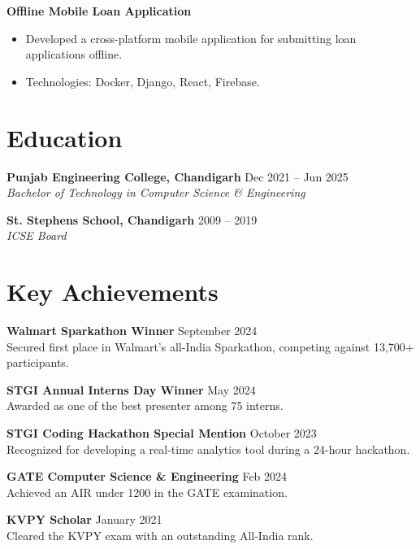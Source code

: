 \documentclass[a4paper,10pt]{article}
\begin{document}
\vspace{-1mm}
\textbf{Offline Mobile Loan Application} \hfill  \\
\vspace{-5mm}
\begin{itemize}[noitemsep]
    \item Developed a cross-platform mobile application for submitting loan applications offline.
    \item Technologies: Docker, Django, React, Firebase.
\end{itemize}

\vspace{-1mm}
\section*{Education}

\textbf{Punjab Engineering College, Chandigarh} \hfill Dec 2021 – Jun 2025 \\
\textit{Bachelor of Technology in Computer Science \& Engineering}

\vspace{-1mm}
\textbf{St. Stephens School, Chandigarh} \hfill 2009 – 2019 \\
\textit{ICSE Board}

\vspace{-1mm}
\section*{Key Achievements}

\textbf{Walmart Sparkathon Winner} \hfill September 2024 \\
Secured first place in Walmart’s all-India Sparkathon, competing against 13,700+ participants.

\vspace{-1mm}
\textbf{STGI Annual Interns Day Winner} \hfill May 2024 \\
Awarded as one of the best presenter among 75 interns.

\vspace{-1mm}
\textbf{STGI Coding Hackathon Special Mention} \hfill October 2023 \\
Recognized for developing a real-time analytics tool during a 24-hour hackathon.

\vspace{-1mm}
\textbf{GATE Computer Science \& Engineering} \hfill Feb 2024 \\
Achieved an AIR under 1200 in the GATE examination.

\vspace{-1mm}
\textbf{KVPY Scholar} \hfill  January 2021 \\
Cleared the KVPY exam with an outstanding All-India rank.
\end{document}
